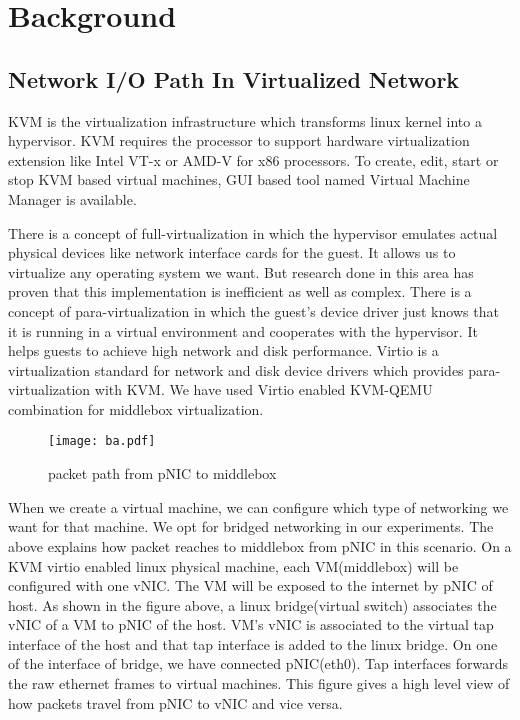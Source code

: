 \documentclass[a4paper,11pt]{report}
\begin{document}
\chapter{Background}
\section{Network I/O Path In Virtualized Network}
KVM is the virtualization infrastructure which transforms linux kernel into a hypervisor. KVM requires the processor to support hardware virtualization extension like Intel VT-x or AMD-V for x86 processors. To create, edit, start or stop KVM based virtual machines, GUI based tool named Virtual Machine Manager is available. 

There is a concept of full-virtualization in which the hypervisor emulates actual physical devices like network interface cards for the guest. It allows us to virtualize any operating system we want. But research done in this area has proven that this implementation is inefficient as well as complex. There is a concept of para-virtualization in which the guest's device driver just knows that it is running in a virtual environment and cooperates with the hypervisor. It helps guests to achieve high network and disk performance. Virtio is a virtualization standard for network and disk device drivers which provides para-virtualization with KVM. We have used Virtio enabled KVM-QEMU combination for middlebox virtualization. 
\begin{figure}[h]
\centering
\texttt{[image: ba.pdf]}
\caption{packet path from pNIC to middlebox}
\end{figure}

When we create a virtual machine, we can configure which type of networking we want for that machine. We opt for bridged networking in our experiments. The above explains how packet reaches to middlebox from pNIC in this scenario. On a KVM virtio enabled linux physical machine, each VM(middlebox) will be configured with one vNIC. The VM will be exposed to the internet by pNIC of host. As shown in the figure above, a linux  bridge(virtual switch) associates the vNIC of a VM to pNIC of the host. VM's vNIC is associated to the virtual tap interface of the host and that tap interface is added to the linux bridge. On one of the interface of bridge, we have connected pNIC(eth0). Tap interfaces forwards the raw ethernet frames to virtual machines. This figure gives a high level view of how packets travel from pNIC to vNIC and vice versa.
\end{document}
